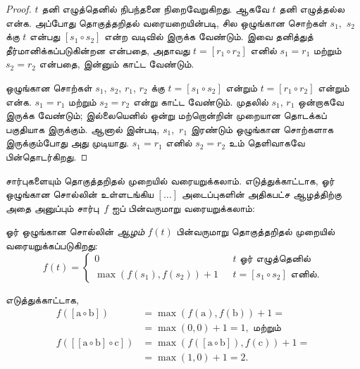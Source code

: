 \documentclass[../../../include/open-logic-section]{subfiles}
\begin{document}
\begin{proof}
  $t$ தனி எழுத்தெனில் நிபந்தனை நிறைவேறுகிறது.
  ஆகவே $t$ தனி எழுத்தல்ல என்க. அப்போது
  தொகுத்தறிதல் வரையறையின்படி, சில ஒழுங்கான
  சொற்கள் $s_1$,~$s_2$ க்கு $t$ என்பது
  $[s_1 \circ s_2]$ என்ற வடிவில் இருக்க
  வேண்டும். இவை தனித்துத் தீர்மானிக்கப்படுகின்றன
  என்பதை, அதாவது $t = [r_1 \circ r_2]$
  எனில் $s_1 = r_1$ மற்றும் $s_2 = r_2$
  என்பதை, இன்னும் காட்ட வேண்டும்.

  ஒழுங்கான சொற்கள் $s_1$, $s_2$, $r_1$,
  $r_2$ க்கு $t = [s_1 \circ s_2]$
  என்றும் $t = [r_1 \circ r_2]$ என்றும்
  என்க. $s_1 = r_1$ மற்றும்
  $s_2 = r_2$ என்று காட்ட வேண்டும்.
  முதலில் $s_1$, $r_1$ ஒன்றாகவே இருக்க
  வேண்டும்; இல்லையெனில் ஒன்று மற்றொன்றின்
  முறையான தொடக்கப் பகுதியாக இருக்கும்.
  ஆனால்  இன்படி,
  $s_1$,~$r_1$ இரண்டும் ஒழுங்கான சொற்களாக
  இருக்கும்போது அது முடியாது. $s_1 = r_1$
  எனில் $s_2 = r_2$ உம் தெளிவாகவே
  பின்தொடர்கிறது.
\end{proof}

சார்புகளையும் தொகுத்தறிதல் முறையில்
வரையறுக்கலாம். எடுத்துக்காட்டாக, ஓர் ஒழுங்கான
சொல்லின் உள்ளடங்கிய $[\dots]$ அடைப்புகளின்
அதிகபட்ச ஆழத்திற்கு அதை அனுப்பும் சார்பு~$f$
ஐப் பின்வருமாறு வரையறுக்கலாம்:

\begin{defn}
   ஓர் ஒழுங்கான சொல்லின்
  \emph{ஆழம்} $f(t)$ பின்வருமாறு
  தொகுத்தறிதல் முறையில் வரையறுக்கப்படுகிறது:
  \[
  f(t) = \begin{cases}
    0 & \text{ $t$ ஓர் எழுத்தெனில்}\\
    \max(f(s_1), f(s_2)) + 1 & \text{ $t = [s_1 \circ s_2]$ எனில்.}
  \end{cases}
  \]
\end{defn}

எடுத்துக்காட்டாக,
\begin{align*}
  f([\mathrm{a} \circ \mathrm{b}]) & =
    \max(f(\mathrm{a}),f(\mathrm{b})) + 1 = \\
  &= \max(0, 0) + 1 = 1, \text{ மற்றும்}\\
  f([[\mathrm{a} \circ \mathrm{b}] \circ \mathrm{c}]) & =
    \max(f([\mathrm{a} \circ \mathrm{b}]), f(\mathrm{c})) + 1 = \\
  & = \max(1,0) + 1 = 2.
\end{align*}
\end{document}
